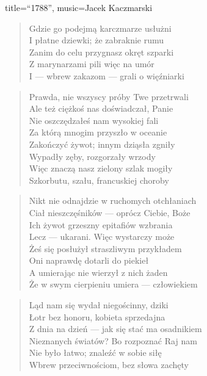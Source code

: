 \begin{song}{title={``1788''}, music={Jacek Kaczmarski}}
\begin{multicols}{2}
\begin{verse}
        Gdzie go podejmą karczmarze usłużni \\ 
        I płatne dziewki; że zabraknie rumu \\
        Zanim do celu przygnasz okręt szparki \\
        Z marynarzami pili więc na umór \\
        I --- wbrew zakazom --- grali o więźniarki
    \end{verse}
    \vfill\null\columnbreak{}
    \begin{verse}
        Prawda, nie wszyscy próby Twe przetrwali \\
        Ale też ciężkoś nas doświadczał, Panie \\
        Nie oszczędzałeś nam wysokiej fali \\ 
        Za którą mnogim przyszło w oceanie \\
        Zakończyć żywot; innym dziąsła zgniły \\
        Wypadły zęby, rozgorzały wrzody \\ 
        Więc znaczą nasz zielony szlak mogiły \\
        Szkorbutu, szału, francuskiej choroby
    \end{verse}
    \begin{verse}
        Nikt nie odnajdzie w ruchomych otchłaniach \\
        Ciał nieszczęśników --- oprócz Ciebie, Boże \\
        Ich żywot grzeszny epitafiów wzbrania \\
        Lecz --- ukarani. Więc wystarczy może \\ 
        Żeś się posłużył straszliwym przykładem \\
        Oni naprawdę dotarli do piekieł \\
        A umierając nie wierzył z nich żaden \\
        Że w swym cierpieniu umiera --- człowiekiem
    \end{verse}
    \begin{verse}
        Ląd nam się wydał niegościnny, dziki \\
        Łotr bez honoru, kobieta sprzedajna \\
        Z dnia na dzień --- jak się stać ma osadnikiem \\
        Nieznanych światów? Bo rozpoznać Raj nam \\
        Nie było łatwo; znaleźć w sobie siłę \\
        Wbrew przeciwnościom, bez słowa zachęty \\

\end{verse}
\end{multicols}
\end{song}
